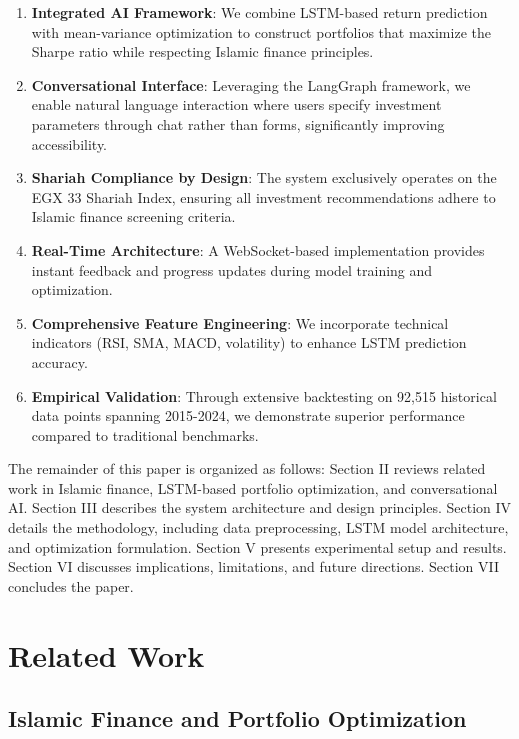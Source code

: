 \documentclass[conference]{IEEEtran}
\begin{document}
\begin{enumerate}
\item \textbf{Integrated AI Framework}: We combine LSTM-based return prediction with mean-variance optimization to construct portfolios that maximize the Sharpe ratio while respecting Islamic finance principles.

\item \textbf{Conversational Interface}: Leveraging the LangGraph framework, we enable natural language interaction where users specify investment parameters through chat rather than forms, significantly improving accessibility.

\item \textbf{Shariah Compliance by Design}: The system exclusively operates on the EGX 33 Shariah Index, ensuring all investment recommendations adhere to Islamic finance screening criteria.

\item \textbf{Real-Time Architecture}: A WebSocket-based implementation provides instant feedback and progress updates during model training and optimization.

\item \textbf{Comprehensive Feature Engineering}: We incorporate technical indicators (RSI, SMA, MACD, volatility) to enhance LSTM prediction accuracy.

\item \textbf{Empirical Validation}: Through extensive backtesting on 92,515 historical data points spanning 2015-2024, we demonstrate superior performance compared to traditional benchmarks.
\end{enumerate}

The remainder of this paper is organized as follows: Section II reviews related work in Islamic finance, LSTM-based portfolio optimization, and conversational AI. Section III describes the system architecture and design principles. Section IV details the methodology, including data preprocessing, LSTM model architecture, and optimization formulation. Section V presents experimental setup and results. Section VI discusses implications, limitations, and future directions. Section VII concludes the paper.

\section{Related Work}

\subsection{Islamic Finance and Portfolio Optimization}
\end{document}
